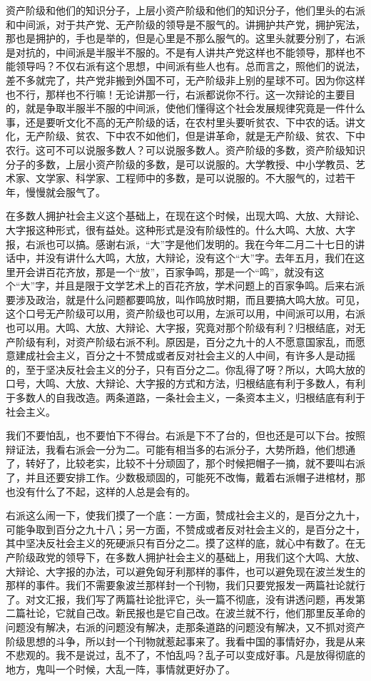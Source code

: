 资产阶级和他们的知识分子，上层小资产阶级和他们的知识分子，他们里头的右派和中间派，对于共产党、无产阶级的领导是不服气的。讲拥护共产党，拥护宪法，那也是拥护的，手也是举的，但是心里是不那么服气的。这里头就要分别了，右派是对抗的，中间派是半服半不服的。不是有人讲共产党这样也不能领导，那样也不能领导吗？不仅右派有这个思想，中间派有些人也有。总而言之，照他们的说法，差不多就完了，共产党非搬到外国不可，无产阶级非上别的星球不可。因为你这样也不行，那样也不行嘛！无论讲那一行，右派都说你不行。这一次辩论的主要目的，就是争取半服半不服的中间派，使他们懂得这个社会发展规律究竟是一件什么事，还是要听文化不高的无产阶级的话，在农村里头要听贫农、下中农的话。讲文化，无产阶级、贫农、下中农不如他们，但是讲革命，就是无产阶级、贫农、下中农行。这可不可以说服多数人？可以说服多数人。资产阶级的多数，资产阶级知识分子的多数，上层小资产阶级的多数，是可以说服的。大学教授、中小学教员、艺术家、文学家、科学家、工程师中的多数，是可以说服的。不大服气的，过若干年，慢慢就会服气了。

在多数人拥护社会主义这个基础上，在现在这个时候，出现大鸣、大放、大辩论、大字报这种形式，很有益处。这种形式是没有阶级性的。什么大鸣、大放、大字报，右派也可以搞。感谢右派，“大”字是他们发明的。我在今年二月二十七日的讲话中，并没有讲什么大鸣，大放，大辩论，没有这个“大”字。去年五月，我们在这里开会讲百花齐放，那是一个“放”，百家争鸣，那是一个“鸣”，就没有这个“大”字，并且是限于文学艺术上的百花齐放，学术问题上的百家争鸣。后来右派要涉及政治，就是什么问题都要鸣放，叫作鸣放时期，而且要搞大鸣大放。可见，这个口号无产阶级可以用，资产阶级也可以用，左派可以用，中间派可以用，右派也可以用。大鸣、大放、大辩论、大字报，究竟对那个阶级有利？归根结底，对无产阶级有利，对资产阶级右派不利。原因是，百分之九十的人不愿意国家乱，而愿意建成社会主义，百分之十不赞成或者反对社会主义的人中间，有许多人是动摇的，至于坚决反社会主义的分子，只有百分之二。你乱得了呀？所以，大鸣大放的口号，大鸣、大放、大辩论、大字报的方式和方法，归根结底有利于多数人，有利于多数人的自我改造。两条道路，一条社会主义，一条资本主义，归根结底有利于社会主义。

我们不要怕乱，也不要怕下不得台。右派是下不了台的，但也还是可以下台。按照辩证法，我看右派会一分为二。可能有相当多的右派分子，大势所趋，他们想通了，转好了，比较老实，比较不十分顽固了，那个时候把帽子一摘，就不要叫右派了，并且还要安排工作。少数极顽固的，可能死不改悔，戴着右派帽子进棺材，那也没有什么了不起，这样的人总是会有的。

右派这么闹一下，使我们摸了一个底：一方面，赞成社会主义的，是百分之九十，可能争取到百分之九十八；另一方面，不赞成或者反对社会主义的，是百分之十，其中坚决反社会主义的死硬派只有百分之二。摸了这样的底，就心中有数了。在无产阶级政党的领导下，在多数人拥护社会主义的基础上，用我们这个大鸣、大放、大辩论、大字报的办法，可以避免匈牙利那样的事件，也可以避免现在波兰发生的那样的事件。我们不需要象波兰那样封一个刊物，我们只要党报发一两篇社论就行了。对文汇报，我们写了两篇社论批评它，头一篇不彻底，没有讲透问题，再发第二篇社论，它就自己改。新民报也是它自己改。在波兰就不行，他们那里反革命的问题没有解决，右派的问题没有解决，走那条道路的问题没有解决，又不抓对资产阶级思想的斗争，所以封一个刊物就惹起事来了。我看中国的事情好办，我是从来不悲观的。我不是说过，乱不了，不怕乱吗？乱子可以变成好事。凡是放得彻底的地方，鬼叫一个时候，大乱一阵，事情就更好办了。

